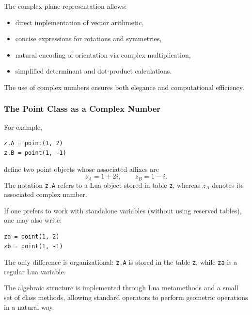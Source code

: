 The complex-plane representation allows:

\begin{itemize}
\item direct implementation of vector arithmetic,
\item concise expressions for rotations and symmetries,
\item natural encoding of orientation via complex multiplication,
\item simplified determinant and dot-product calculations.
\end{itemize}

The use of complex numbers ensures both elegance and computational efficiency.

\subsubsection{The Point Class as a Complex Number}
\label{sub:complex_numbers}

For example,
\begin{verbatim}
z.A = point(1, 2)
z.B = point(1, -1)
\end{verbatim}
define two point objects whose associated affixes are
\[
z_A = 1 + 2i,
\qquad
z_B = 1 - i.
\]
The notation \verb|z.A| refers to a Lua object stored in table \verb|z|,
whereas \(z_A\) denotes its associated complex number.

\medskip
If one prefers to work with standalone variables (without using reserved
tables), one may also write:
\begin{verbatim}
za = point(1, 2)
zb = point(1, -1)
\end{verbatim}
The only difference is organizational: \verb|z.A| is stored in the table
\verb|z|, while \verb|za| is a regular Lua variable.

\medskip
The algebraic structure is implemented through Lua metamethods and a small
set of class methods, allowing standard operators to perform geometric
operations in a natural way.

